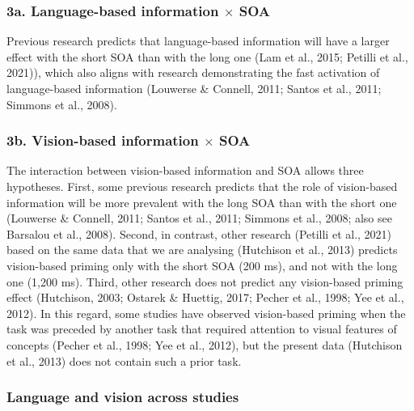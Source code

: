 \documentclass[
  12pt,
  man,floatsintext]{apa7}
\begin{document}
\hypertarget{a.-language-based-information-times-soa}{%
\subsubsection{\texorpdfstring{3a. Language-based information \(\times\) SOA}{3a. Language-based information \textbackslash times SOA}}\label{a.-language-based-information-times-soa}}

Previous research predicts that language-based information will have a larger effect with the short SOA than with the long one (Lam et al., 2015; Petilli et al., 2021)), which also aligns with research demonstrating the fast activation of language-based information (Louwerse \& Connell, 2011; Santos et al., 2011; Simmons et al., 2008).

\hypertarget{b.-vision-based-information-times-soa}{%
\subsubsection{\texorpdfstring{3b. Vision-based information \(\times\) SOA}{3b. Vision-based information \textbackslash times SOA}}\label{b.-vision-based-information-times-soa}}

The interaction between vision-based information and SOA allows three hypotheses. First, some previous research predicts that the role of vision-based information will be more prevalent with the long SOA than with the short one (Louwerse \& Connell, 2011; Santos et al., 2011; Simmons et al., 2008; also see Barsalou et al., 2008). Second, in contrast, other research (Petilli et al., 2021) based on the same data that we are analysing (Hutchison et al., 2013) predicts vision-based priming only with the short SOA (200 ms), and not with the long one (1,200 ms). Third, other research does not predict any vision-based priming effect (Hutchison, 2003; Ostarek \& Huettig, 2017; Pecher et al., 1998; Yee et al., 2012). In this regard, some studies have observed vision-based priming when the task was preceded by another task that required attention to visual features of concepts (Pecher et al., 1998; Yee et al., 2012), but the present data (Hutchison et al., 2013) does not contain such a prior task.

\hypertarget{language-and-vision-across-studies}{%
\subsubsection{Language and vision across studies}\label{language-and-vision-across-studies}}
\end{document}
